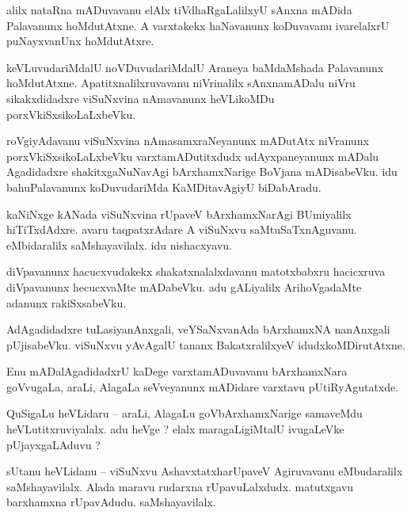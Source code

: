 \documentclass{article}
\begin{document}
\begin{mn}%
alilx nataRna mADuvavanu elAlx tiVdhaRgaLalilxyU sAnxna mADida Palavanunx hoMdutAtxne. A 
varxtakekx haNavanunx koDuvavanu ivarelalxrU puNayxvanUnx hoMdutAtxre.
\end{mn}

\begin{mn}%
keVLuvudariMdalU noVDuvudariMdalU Araneya baMdaMshada Palavanunx hoMdutAtxne. 
Apatitxnalilxruvavanu niVrinalilx sAnxnamADalu niVru sikakxdidadxre viSuNxvina nAmavanunx 
heVLikoMDu porxVkiSxsikoLaLxbeVku.
\end{mn}

\begin{mn}%
roVgiyAdavanu viSuNxvina nAmasamxraNeyanunx mADutAtx niVranunx porxVkiSxsikoLaLxbeVku 
varxtamADutitxdudx udAyxpaneyanunx mADalu Agadidadxre shakitxgaNuNavAgi bArxhamxNarige BoVjana 
mADisabeVku. idu bahuPalavanunx koDuvudariMda KaMDitavAgiyU biDabAradu.
\end{mn}

\begin{mn}%
kaNiNxge kANada viSuNxvina rUpaveV bArxhamxNarAgi BUmiyalilx hiTiTxdAdxre. avaru taqpatxrAdare A 
viSuNxvu saMtuSaTxnAguvanu. eMbidaralilx saMshayavilalx. idu nishacxyavu.
\end{mn}

\begin{mn}%
diVpavanunx hacucxvudakekx shakatxnalalxdavanu matotxbabxru hacicxruva diVpavanunx hecucxvaMte 
mADabeVku. adu gALiyalilx ArihoVgadaMte adanunx rakiSxsabeVku.
\end{mn}

\begin{mn}%
AdAgadidadxre tuLasiyanAnxgali, veYSaNxvanAda bArxhamxNA nanAnxgali pUjisabeVku. viSuNxvu yAvAgalU 
tananx BakatxralilxyeV idudxkoMDirutAtxne.
\end{mn}

\begin{mn}%
Enu mADalAgadidadxrU kaDege varxtamADuvavanu bArxhamxNara goVvugaLa, araLi, AlagaLa seVveyanunx 
mADidare varxtavu pUtiRyAgutatxde.
\end{mn}

\begin{mn}%
QuSigaLu heVLidaru -- araLi, AlagaLu goVbArxhamxNarige samaveMdu heVLutitxruviyalalx. adu heVge ? 
elalx maragaLigiMtalU ivugaLeVke pUjayxgaLAduvu ?
\end{mn}

\begin{mn}%
sUtanu heVLidanu -- viSuNxvu AshavxtatxharUpaveV Agiruvavanu eMbudaralilx saMshayavilalx. Alada 
maravu rudarxna rUpavuLalxdudx. matutxgavu barxhamxna rUpavAdudu. saMshayavilalx.
\end{mn}
\end{document}
